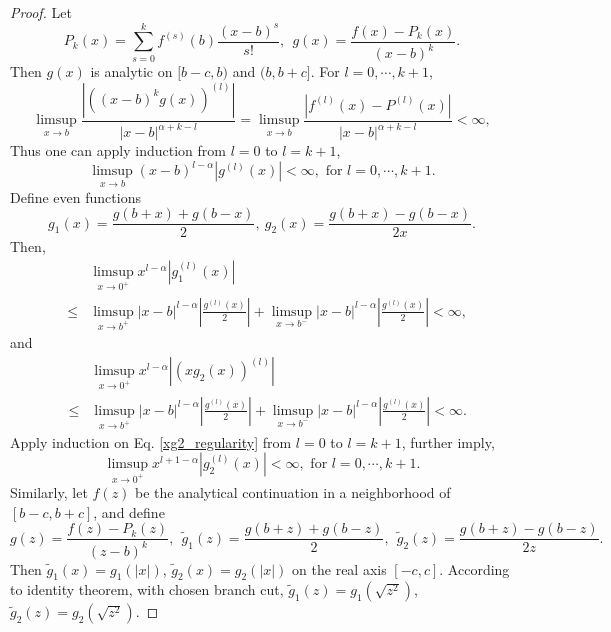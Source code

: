 \documentclass[11pt]{article}
\begin{document}
\begin{proof} 
Let \begin{equation}
    P_k(x) = \sum_{s=0}^k f^{(s)}(b)\frac{(x-b)^s}{s!}, \ \ g(x) = \frac{f(x)-P_k(x)}{(x-b)^k}.
\end{equation} 
Then $g(x)$ is analytic on $[b-c,b)$ and $(b,b+c]$. For $l =0,\cdots,k+1$,
\begin{equation}
    \limsup_{x\to b} \frac{|\left((x-b)^k g(x)\right)^{(l)}|}{|x-b|^{\alpha+k-l}}=\limsup_{x\to b} \frac{|f^{(l)}(x)-P^{(l)}(x)|}{|x-b|^{\alpha+k-l}} < \infty,
\end{equation}
Thus one can apply induction from $l=0$ to $l =k+1$,
\begin{equation}
    \limsup_{x\to b} (x-b)^{l-\alpha} |g^{(l)}(x)| < \infty, \text{ for } l =0,\cdots,k+1.
\end{equation}
Define even functions
\begin{equation}
    g_1(x) = \frac{g(b+x) + g(b-x)}{2}, \ g_2(x) = \frac{g(b+x) - g(b-x)}{2x}.
\end{equation}
Then,
\begin{eqnarray}
    &&\limsup_{x\to 0^+} x^{l-\alpha} |g^{(l)}_1(x)| \nonumber\\
    &\leq& \limsup_{x\to b^+}   |x-b|^{l-\alpha}\left|\frac{g^{(l)}(x)}{2}\right| + \limsup_{x\to b^-}   |x-b|^{l-\alpha}\left|\frac{g^{(l)}(x)}{2}\right| < \infty,
\end{eqnarray}
and
\begin{eqnarray}
    &&\limsup_{x\to 0^+} x^{l-\alpha} |(xg_2(x))^{(l)}| \nonumber\\
    &\leq& \limsup_{x\to b^+}   |x-b|^{l-\alpha}\left|\frac{g^{(l)}(x)}{2}\right| + \limsup_{x\to b^-}   |x-b|^{l-\alpha}\left|\frac{g^{(l)}(x)}{2}\right| < \infty. \label{xg2_regularity}
\end{eqnarray}
Apply induction on Eq. \eqref{xg2_regularity} from $l=0$ to $l =k+1$, further imply,
\begin{equation}
    \limsup_{x\to 0^+} x^{l+1-\alpha} |g_2^{(l)}(x)| < \infty, \text{ for } l = 0, \cdots, k+1.
\end{equation}
Similarly, let $f(z)$ be the analytical continuation in a neighborhood of $[b-c,b+c]$, and define 
\begin{equation}
    g(z) = \frac{f(z)-P_k(z)}{(z-b)^k}, \ \ \tilde{g}_1(z) = \frac{g(b+z) + g(b-z)}{2},\ \ \tilde{g}_2(z) = \frac{g(b+z) - g(b-z)}{2z}. \nonumber
\end{equation}
Then $\tilde{g}_1(x) = g_1(|x|)$, $\tilde{g}_2(x) = g_2(|x|)$ on the real axis $[-c,c]$. According to identity theorem, with chosen branch cut, $\tilde{g}_1(z) = g_1(\sqrt{z^2})$, $\tilde{g}_2(z) = g_2(\sqrt{z^2})$.
\end{proof}
\end{document}

